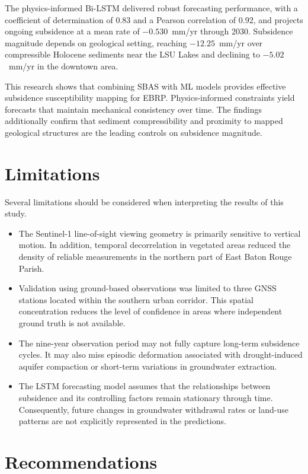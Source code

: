 \documentclass[oneside,doublespacing,flushright]{lsuthesis}
\begin{document}
The physics-informed Bi-LSTM delivered robust forecasting performance, with a coefficient of determination of 0.83 and a Pearson correlation of 0.92, and projects ongoing subsidence at a mean rate of $-0.530$~mm/yr through 2030. Subsidence magnitude depends on geological setting, reaching $-12.25$~mm/yr over compressible Holocene sediments near the LSU Lakes and declining to $-5.02$~mm/yr in the downtown area.

This research shows that combining SBAS with ML models provides effective subsidence susceptibility mapping for EBRP. Physics-informed constraints yield forecasts that maintain mechanical consistency over time. 
The findings additionally confirm that sediment compressibility and proximity to mapped geological structures are the leading controls on subsidence magnitude.


\section{Limitations}

Several limitations should be considered when interpreting the results of this study.

\begin{itemize}
    \item The Sentinel-1 line-of-sight viewing geometry is primarily sensitive to vertical motion. In addition, temporal decorrelation in vegetated areas reduced the density of reliable measurements in the northern part of East Baton Rouge Parish.
    \item Validation using ground-based observations was limited to three GNSS stations located within the southern urban corridor. This spatial concentration reduces the level of confidence in areas where independent ground truth is not available.
    \item The nine-year observation period may not fully capture long-term subsidence cycles. It may also miss episodic deformation associated with drought-induced aquifer compaction or short-term variations in groundwater extraction.
    \item The LSTM forecasting model assumes that the relationships between subsidence and its controlling factors remain stationary through time. Consequently, future changes in groundwater withdrawal rates or land-use patterns are not explicitly represented in the predictions.
\end{itemize}



\section{Recommendations}
\end{document}
